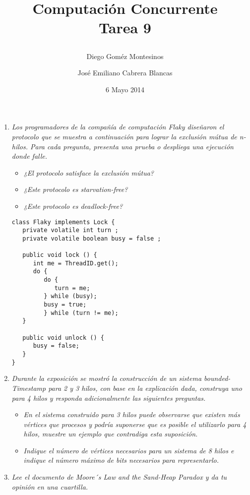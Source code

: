 \documentclass{article}
\title{ Computación Concurrente \\ \Large{Tarea 9}
\author{
  Diego Goméz Montesinos
  \and
  José Emiliano Cabrera Blancas
  }
\date{6 Mayo 2014}
}
\begin{document}
\maketitle
\begin{enumerate}
  
\item{
    \textsl{
      Los programadores de la compañía de computación Flaky diseñaron
      el protocolo que se muestra a continuación para lograr la
      exclusión mútua de n-hilos. Para cada pregunta, presenta una
      prueba o despliega una ejecución donde falle.
    }
      \begin{itemize}
        \item{\textsl{¿El protocolo satisface la exclusión mútua?}}
        \item{\textsl{¿Este protocolo es starvation-free?}}
        \item{\textsl{¿Este protocolo es deadlock-free?}}
      \end{itemize}

      \renewcommand{\lstlistingname}{}
\begin{lstlisting}[frame=single]
class Flaky implements Lock {
   private volatile int turn ;
   private volatile boolean busy = false ; 
   
   public void lock () {
      int me = ThreadID.get();
      do {
         do {
            turn = me;
         } while (busy);
         busy = true;
         } while (turn != me);
   }

   public void unlock () {
      busy = false;
   }
}
\end{lstlisting}
      
  }

\item{
    \textsl{
      Durante la exposición se mostró la construcción de un sistema
      bounded-Timestamp para 2 y 3 hilos, con base en la explicación
      dada, construya uno para 4 hilos y responda adicionalmente las
      siguientes preguntas.
    }
    \begin{itemize}
    \item{\textsl{
          En el sistema construido para 3 hilos puede observarse que
          existen más vértices que procesos y podría suponerse que es
          posible el utilizarlo para 4 hilos, muestre un ejemplo que
          contradiga esta suposición.
        }}

    \item{\textsl{
          Indique el número de vértices necesarios para un sistema de
          8 hilos e indique el número máximo de bits necesarios para
          representarlo.
        }}
    \end{itemize}
  }
    
\item{
    \textsl{
      Lee el documento de Moore´s Law and the Sand-Heap Paradox y da
      tu opinión en una cuartilla.
    }
  }
  
\end{enumerate}
\end{document}
